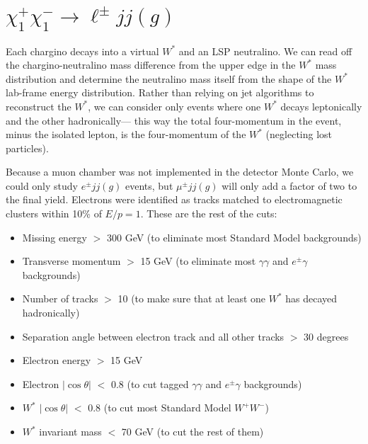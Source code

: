 \documentclass[12pt]{article}
\begin{document}
\section*{$\chi_1^+\chi_1^- \to \ell^\pm jj(g)$}

Each chargino decays into a virtual $W^*$ and an LSP neutralino.  We
can read off the chargino-neutralino mass difference from the upper
edge in the $W^*$ mass distribution and determine the neutralino mass
itself from the shape of the $W^*$ lab-frame energy distribution.
Rather than relying on jet algorithms to reconstruct the $W^*$, we can
consider only events where one $W^*$ decays leptonically and the other
hadronically--- this way the total four-momentum in the event, minus
the isolated lepton, is the four-momentum of the $W^*$ (neglecting
lost particles).

Because a muon chamber was not implemented in the detector Monte
Carlo, we could only study $e^\pm jj(g)$ events, but $\mu^\pm jj(g)$
will only add a factor of two to the final yield.  Electrons were
identified as tracks matched to electromagnetic clusters within 10\%
of $E/p = 1$.  These are the rest of the cuts:
\begin{itemize}

  \item Missing energy $>$ 300 GeV (to eliminate most Standard Model
    backgrounds)

  \item Transverse momentum $>$ 15 GeV (to eliminate most
    $\gamma\gamma$ and $e^\pm \gamma$ backgrounds)

  \item Number of tracks $>$ 10 (to make sure that at least one $W^*$
    has decayed hadronically)

  \item Separation angle between electron track and all other tracks
    $>$ 30 degrees

  \item Electron energy $>$ 15 GeV

  \item Electron $|\cos\theta|$ $<$ 0.8 (to cut tagged
    $\gamma\gamma$ and $e^\pm \gamma$ backgrounds)

  \item $W^*$ $|\cos\theta|$ $<$ 0.8 (to cut most Standard Model
    $W^+W^-$)

  \item $W^*$ invariant mass $<$ 70 GeV (to cut the rest of them)

\end{itemize}
\end{document}
